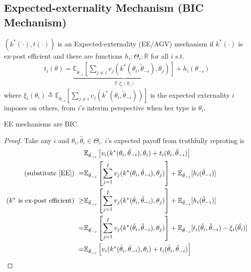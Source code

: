 \documentclass[11pt]{elegantbook}
\begin{document}
\subsection{Expected-externality Mechanism (BIC Mechanism)}
\begin{definition}[EE Mechanism]
\normalfont
    $(k^*(\cdot),t(\cdot))$ is an Expected-externality (EE/AGV) mechanism if $k^*(\cdot)$ is ex-post efficient and there are functions $h_i:\Theta_i: \mathbb{R}$ for all $i$ s.t.
    \begin{equation}
        \begin{aligned}
            t_i(\theta)=\underbrace{\mathbb{E}_{\tilde{\theta}_{-i}}\left[\sum_{j\neq i}v_j(k^*(\theta_i,\tilde{\theta}_{-i}),\theta_j)\right]}_{\triangleq \xi_i(\theta_i)}+h_i(\theta_{-i})
        \end{aligned}
        \label{EE}
    \end{equation}
    where $\xi_i(\theta_i)\triangleq\mathbb{E}_{\tilde{\theta}_{-i}}\left[\sum_{j\neq i}v_j(k^*(\theta_i,\tilde{\theta}_{-i}))\right]$ is the expected externality $i$ imposes on others, from $i$'s interim perspective when her type is $\theta_i$.
\end{definition}

\begin{proposition}
    EE mechanisms are BIC.
\end{proposition}
\begin{proof}
    Take any $i$ and $\theta_i,\hat{\theta}_i\in\Theta_i$. $i$'s expected payoff from truthfully reproting is
    \begin{equation}
        \begin{aligned}
            &\mathbb{E}_{\tilde{\theta}_{-i}}\left[v_i(k^*(\theta_i,\tilde{\theta}_{-i}),\theta_i)+t_i(\theta_i,\tilde{\theta}_{-i})\right]\\
            \textnormal{(substitute \eqref{EE}) }=&\mathbb{E}_{\tilde{\theta}_{-i}}\left[\sum_{j=1}^I v_j(k^*(\theta_i,\tilde{\theta}_{-i}),\theta_j)\right]+\mathbb{E}_{\tilde{\theta}_{-i}}[h_i(\tilde{\theta}_{-i})]\\
           \textnormal{($k^*$ is ex-post efficient) } \geq& \mathbb{E}_{\tilde{\theta}_{-i}}\left[\sum_{j=1}^I v_j(k^*(\hat{\theta}_i,\tilde{\theta}_{-i}),\theta_j)\right]+\mathbb{E}_{\tilde{\theta}_{-i}}[h_i(\tilde{\theta}_{-i})]\\
           =& \mathbb{E}_{\tilde{\theta}_{-i}}\left[\sum_{j=1}^I v_j(k^*(\hat{\theta}_i,\tilde{\theta}_{-i}),\theta_j)\right]+\mathbb{E}_{\tilde{\theta}_{-i}}[t_i(\hat{\theta}_i,\tilde{\theta}_{-i})-\xi_i(\hat{\theta_i})]\\
           =&\mathbb{E}_{\tilde{\theta}_{-i}}\left[v_i(k^*(\hat{\theta}_i,\tilde{\theta}_{-i}),\theta_i)+t_i(\hat{\theta}_i,\tilde{\theta}_{-i})\right]
        \end{aligned}
        \nonumber
    \end{equation}
\end{proof}
\end{document}
